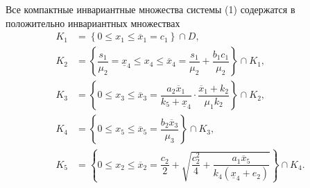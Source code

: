 \documentclass[14pt,a4paper]{extarticle}
\begin{document}
	\begin{theorem}\label{th:inv_comp}
		Все компактные инвариантные множества системы (1) содержатся в положительно инвариантных множествах
		\begin{align*}
			K_1 &=\left\{0 \leqslant x_1 \leqslant \overline{x}_1 = c_1\right\}\cap D,\\[6pt]
			K_2 &=\left\{\dfrac{s_1}{\mu_2} = \underline{x}_4 \leqslant x_4 \leqslant \overline{x}_4 = \dfrac{s_1}{\mu_2} + \dfrac{b_1c_1}{\mu_2}\right\}\cap K_1,\\[6pt]
			K_3 &=\left\{0 \leqslant x_3 \leqslant \overline{x}_3 = \dfrac{a_2\overline{x}_1}{k_5+\underline{x}_4}\cdot\dfrac{\overline{x}_1+k_2}{\mu_1k_2}\right\}\cap K_2,\\[6pt]
			K_4 &=\left\{0 \leqslant x_5 \leqslant \overline{x}_5 = \dfrac{b_2\overline{x}_3}{\mu_3}\right\}\cap K_3,\\[6pt]
			K_5 &=\left\{0 \leqslant x_2 \leqslant \overline{x}_2 =  \dfrac{c_2}{2}+\sqrt{\dfrac{c_2^2}{4}+\dfrac{a_1\overline{x}_5}{k_4(\underline{x}_4+e_2)}}\right\}\cap K_4.
		\end{align*}
	\end{theorem}
\end{document}
